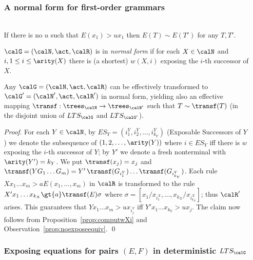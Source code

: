\documentclass[12pt]{article}
\begin{document}
\subsubsection*{A normal form for first-order grammars}


\begin{observ}\label{prop:noexposeequiv}\hfill
\\
If there is no $u$ such that $E(x_1)\gt{u}x_1$ then 
$E(T)\sim E(T')$ for any $T,T'$.
\end{observ}

\begin{defn}\label{def:grammarnormalform}
$\calG=(\calN,\act,\calR)$ is in \emph{normal form} 
if for each  $X\in\calN$ and $i,1\leq i\leq\arity(X)$  there 
is (a shortest) $w(X,i)$ exposing the $i$-th
successor of $X$.
\end{defn}

\begin{prop}\label{prop:transinnormal}
Any $\calG=(\calN,\act,\calR)$ can be effectively transformed
to  $\calG'=(\calN',\act,\calR')$ in normal form, yielding also an
effective mapping $\transf:\trees_{\calN}\rightarrow\trees_{\calN'}$
such that
$T\sim\transf(T)$ (in the disjoint union of $LTS_{\calG}$ and
$LTS_{\calG'}$). 
\end{prop}

\begin{proof}
For each $Y\in\calN$, by $ES_Y=(i^Y_1, i^Y_2,\dots, i^Y_{k_Y})$ (Exposable
Successors of $Y$)
we denote the subsequence 
of $(1,2,\dots,\arity(Y))$ where $i\in ES_Y$ iff there is $w$
exposing the $i$-th successor of $Y$;
by $Y'$ we denote a fresh nonterminal with
$\arity(Y')=k_Y$.
We put $\transf(x_j)=x_j$ and 
$\transf(YG_1\dots G_m)=Y'\, \transf(G_{i^Y_1})\dots
\transf(G_{i^Y_{k_Y}})$.
Each rule $Xx_1\dots x_m\gt{a} E(x_1,\dots,x_m)$ in $\calR$ is transformed to 
the rule $X'x_1\dots x_{k_X}\gt{a} \transf(E)\sigma$
where $\sigma=[x_1/x_{i^X_1}, \dots, x_{k_X}/x_{i^X_{k_X}}]$; thus
$\calR'$ arises.
This guarantees that $Yx_1\dots x_m\gt{u}x_{i^Y_j}$
iff  $Y'x_1\dots x_{k_Y}\gt{u}x_j$.
The claim now follows from
Proposition~\ref{prop:computwXi} and
Observation~\ref{prop:noexposeequiv}.
\qed
\end{proof}


\subsubsection*
{Exposing equations for pairs $(E,F)$ in deterministic $LTS_{\calG}$}
\end{document}
